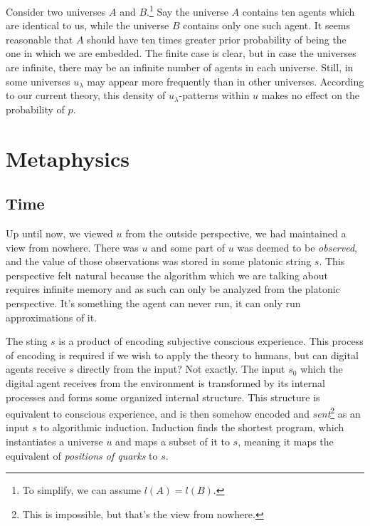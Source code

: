 Consider two universes $A$ and $B$.\footnote{To simplify, we can assume $l(A) = l(B)$.}
Say the universe $A$ contains ten agents which are identical to us, while the universe $B$ contains only one such agent.
It seems reasonable that $A$ should have ten times greater prior probability of being the one in which we are embedded.
The finite case is clear, but in case the universes are infinite, there may be an infinite number of agents in each universe.
Still, in some universes $u_\lambda$ may appear more frequently than in other universes.
According to our current theory, this density of $u_\lambda$-patterns within $u$ makes no effect on the probability of $p$.

\newpage

\section{Metaphysics}

\subsection{Time}

Up until now, we viewed $u$ from the outside perspective, we had maintained a view from nowhere.
There was $u$ and some part of $u$ was deemed to be \textit{observed}, and the value of those observations was stored in some platonic string $s$.
This perspective felt natural because the algorithm which we are talking about requires infinite memory and as such can only be analyzed from the platonic perspective.
It's something the agent can never run, it can only run approximations of it.

The sting $s$ is a product of encoding subjective conscious experience.
This process of encoding is required if we wish to apply the theory to humans, but can digital agents receive $s$ directly from the input?
Not exactly.
The input $s_0$ which the digital agent receives from the environment is transformed by its internal processes and forms some organized internal structure.
This structure is equivalent to conscious experience, and is then somehow encoded and \textit{sent}\footnote{This is impossible, but that's the view from nowhere.} as an input $s$ to algorithmic induction.
Induction finds the shortest program, which instantiates a universe $u$ and maps a subset of it to $s$, meaning it maps the equivalent of \textit{positions of quarks} to $s$.

